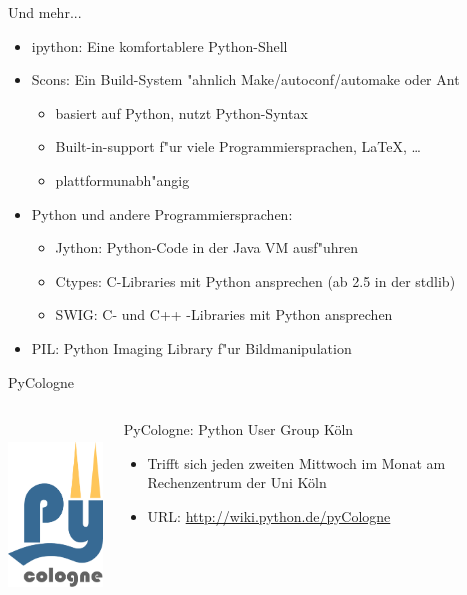 \begin{frame}[fragile]{Und mehr...}
\begin{itemize}
\item \alert{ipython}: Eine komfortablere Python-Shell
\item \alert{Scons}: Ein Build-System "ahnlich Make/autoconf/automake oder Ant
\begin{itemize}
\item basiert auf Python, nutzt Python-Syntax
\item Built-in-support f"ur viele Programmiersprachen, LaTeX, \dots
\item plattformunabh"angig
\end{itemize}
\item Python und andere Programmiersprachen:
\begin{itemize}
\item Jython: Python-Code in der Java VM ausf"uhren
\item Ctypes: C-Libraries mit Python ansprechen (ab 2.5 in der stdlib)
\item SWIG: C- und C++ -Libraries mit Python ansprechen
\end{itemize}
\item \alert{PIL}: Python Imaging Library f"ur Bildmanipulation
\end{itemize}
\end{frame}


\begin{frame}{PyCologne}
\begin{columns}
\begin{column}{0.4\textwidth}
  \includegraphics[height=5cm]{images/pycologne7.pdf}
\end{column}
\begin{column}{0.6\textwidth}
  \alert{PyCologne}: Python User Group K\"oln
  \begin{itemize}
    \item Trifft sich jeden zweiten Mittwoch im Monat am Rechenzentrum der Uni K\"oln
    \item URL: \href{http://wiki.python.de/pyCologne}{http://wiki.python.de/pyCologne}
  \end{itemize}
\end{column}
\end{columns}
  
\end{frame}
